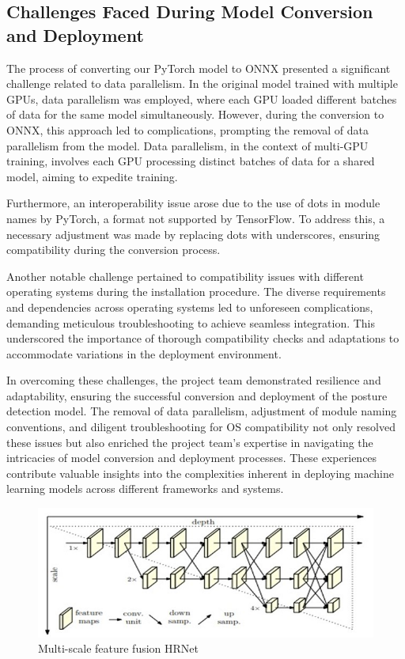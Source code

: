 \documentclass{article}
\begin{document}
\subsection{Challenges Faced During Model Conversion and Deployment}
The process of converting our PyTorch model to ONNX presented a significant challenge related to data parallelism. In the original model trained with multiple GPUs, data parallelism was employed, where each GPU loaded different batches of data for the same model simultaneously. However, during the conversion to ONNX, this approach led to complications, prompting the removal of data parallelism from the model. Data parallelism, in the context of multi-GPU training, involves each GPU processing distinct batches of data for a shared model, aiming to expedite training.

Furthermore, an interoperability issue arose due to the use of dots in module names by PyTorch, a format not supported by TensorFlow. To address this, a necessary adjustment was made by replacing dots with underscores, ensuring compatibility during the conversion process.

Another notable challenge pertained to compatibility issues with different operating systems during the installation procedure. The diverse requirements and dependencies across operating systems led to unforeseen complications, demanding meticulous troubleshooting to achieve seamless integration. This underscored the importance of thorough compatibility checks and adaptations to accommodate variations in the deployment environment.

In overcoming these challenges, the project team demonstrated resilience and adaptability, ensuring the successful conversion and deployment of the posture detection model. The removal of data parallelism, adjustment of module naming conventions, and diligent troubleshooting for OS compatibility not only resolved these issues but also enriched the project team's expertise in navigating the intricacies of model conversion and deployment processes. These experiences contribute valuable insights into the complexities inherent in deploying machine learning models across different frameworks and systems.


\begin{figure}
  \centering
  \includegraphics[width=\textwidth]{Picture.jpg}
  \caption{Multi-scale feature fusion HRNet}
  \label{fig1}
\end{figure}
\end{document}
